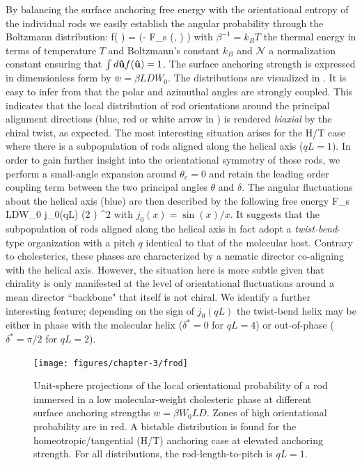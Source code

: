 By balancing the surface anchoring free energy with the orientational entropy of the individual rods we easily establish the angular probability through the Boltzmann distribution:
  \beq
  f( \bhu ) =  \exp (- \beta F_{s} (\delta, \theta)  )
  \label{fsingle}
  \eeq
 with $\beta^{-1} = k_{B}T$ the thermal energy in terms of temperature $T$ and Boltzmann's constant $k_{B}$ and $\mathcal{N}$ a normalization constant ensuring that $\int d {\bf \hat{u}} f({\bf \hat{u}}) = 1$.  The surface anchoring strength is expressed  in dimensionless form by $\bar{w} = \beta LDW_{0}$.  The distributions are visualized in .
It is easy to infer from  that the polar and azimuthal angles are strongly coupled. This indicates that the local distribution of rod orientations around the principal alignment directions (blue, red or white arrow in ) is rendered {\em biaxial} by the chiral twist, as expected.  The most interesting situation arises for the H/T case where there is a subpopulation of  rods aligned along the helical axis ($qL=1$). In order to gain further insight into the orientational symmetry of those rods, we perform a small-angle expansion around   $\theta_{e} = 0$ and retain the leading order coupling term between the two principal angles $\theta$ and $\delta$. The angular fluctuations about the helical axis (blue) are then described by the following free energy
\beq
F_{s} \approx {} LDW_{0}  j_{0}(qL) \cos (2 \delta) \theta^{2}
\label{ht_fluc_new}
\eeq
with $j_{0}(x) = \sin (x)/x$. It suggests that the subpopulation of rods aligned along the helical axis in fact adopt a {\em twist-bend}-type organization with a pitch $q$ identical to that of the molecular host. Contrary to cholesterics, these phases are characterized by a nematic director co-aligning with the helical axis. However, the situation here is more subtle given that  chirality is only manifested at the level of orientational fluctuations around a mean director ``backbone" that itself is not chiral.   We  identify a further interesting feature; depending on the sign of $j_{0}(qL)$ the twist-bend helix may be either in phase with the molecular helix ($\delta^{\ast} =0$ for  $qL=4$) or out-of-phase ($\delta^{\ast} = \pi/2$ for $qL=2$).


  \begin{figure}
	\texttt{[image: figures/chapter-3/frod]}
	\caption{ Unit-sphere projections of the local orientational probability of a rod immersed in a low molecular-weight cholesteric phase at different surface anchoring strengths $\bar{w} = \beta W_{0}LD$. Zones of high orientational probability are in red.  A bistable distribution is found for the homeotropic/tangential (H/T) anchoring case at elevated anchoring strength. For all distributions, the rod-length-to-pitch is $qL=1$. }
	\label{frod}
\end{figure}


